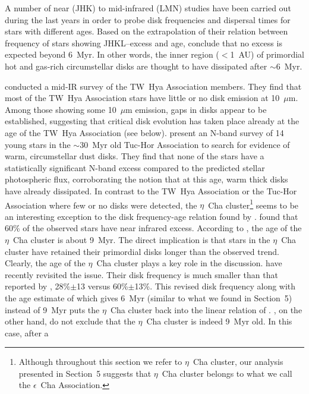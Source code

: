 \documentclass[11pt,twoside]{book}
\begin{document}
A number of near (JHK) to mid-infrared (LMN) studies have been carried out during the  last
years in order to probe disk frequencies and dispersal times for stars with different ages.
Based on the extrapolation of their relation between frequency of  stars showing
JHKL--excess and age,
\cite{Haisch01} conclude that no excess is expected beyond 6~Myr. In  other words,
the inner region ($<$1~AU) of primordial hot and gas-rich circumstellar  disks
are thought to have dissipated after $\sim$6~Myr.

\cite{ray99} \citep[for a summary, see also][]{ray01} conducted a
mid-IR survey of the TW~Hya Association members.  They find that most
of the TW~Hya Association stars have little or no disk emission at
10~$\mu$m.  Among those showing some 10~$\mu$m emission, gaps in disks
appear to be established, suggesting that critical disk evolution has
taken place already at the age of the TW~Hya Association (see below).
\cite{mamajek04} present an N-band survey of 14 young stars in the
$\sim$30~Myr old Tuc-Hor Association to search for evidence of warm,
circumstellar dust disks.  They find that none of the stars have a
statistically significant N-band excess compared to the predicted
stellar photospheric flux, corroborating the notion that at this age,
warm thick disks have already dissipated.  In contrast to the TW~Hya
Association or the Tuc-Hor Association where few or no disks were
detected, the $\eta$~Cha cluster\footnote{Although throughout this
section we refer to $\eta$~Cha cluster, our analysis presented in
Section~5 suggests that $\eta$~Cha cluster belongs to what we call the
$\epsilon$~Cha Association.}  seems to be an interesting exception to
the disk frequency-age relation found by \cite{Haisch01}.
\cite{lyo03} found that 60\% of the observed stars have near infrared
excess.  According to \cite{lawson01b}, the age of the $\eta$~Cha
cluster is about 9~Myr.  The direct implication is that stars in the
$\eta$~Cha cluster have retained their primordial disks longer than
the observed trend.  Clearly, the age of the $\eta$~Cha cluster plays
a key role in the discussion. \cite {Haisch05} have recently revisited
the issue.  Their disk frequency is much smaller than that reported by
\cite{lyo03}, 28\%$\pm$13 versus 60\%$\pm$13\%.  This revised disk
frequency along with the age estimate of \cite{luhmans04} which gives
6~Myr (similar to what we found in Section~5) instead of 9~Myr puts
the $\eta$~Cha cluster back into the linear relation of
\cite{Haisch01}.  \cite{Haisch05}, on the other hand, do not exclude
that the $\eta$~Cha cluster is indeed 9~Myr old. In this case, after a
\end{document}
